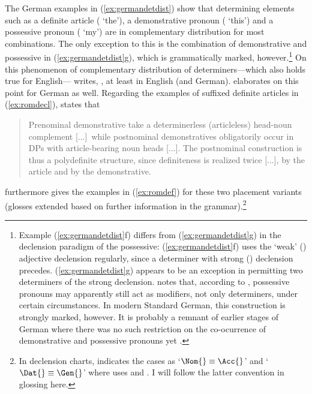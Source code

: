 The German examples in (\ref{ex:germandetdist}) show that determining elements
such as a definite article ( `the'), a demonstrative pronoun
( `this') and a possessive pronoun ( `my') are in
complementary distribution for most combinations. The only exception to this is
the combination of demonstrative and possessive in (\ref{ex:germandetdist}g),
which is grammatically marked, however.\footnote{Example
(\ref{ex:germandetdist}f) differs from (\ref{ex:germandetdist}g) in the
declension paradigm of the possessive: (\ref{ex:germandetdist}f) uses the
`weak' (\Wk) adjective declension regularly, since a determiner with strong
(\St) declension precedes. (\ref{ex:germandetdist}g) appears to be an exception
in permitting two determiners of the strong declension. \citet[160--161,
203--205]{demske2001} notes that, according to \citet{plank1992}, possessive
pronouns may apparently still act as modifiers, not only determiners, under
certain circumstances. In modern Standard German, this construction is strongly
marked, however. It is probably a remnant of earlier stages of German where
there was no such restriction on the co-ocurrence of demonstrative and
possessive pronouns yet \citep[173]{demske2001}.} On this phenomenon of
complementary distribution of determiners---which also holds true for
English---\citet{carnie2013} writes, , at least in English (and German).
\citet[9--22]{demske2001} elaborates on this point for German as well.
Regarding the examples of suffixed definite articles in (\ref{ex:romdecl}),
\citet{dindelegan2013} states that

\blockcquote[297]{dindelegan2013}{Prenominal demonstrative \sic{} take a
determinerless (articleless) head-noun complement [...]\ while postnominal
demonstratives obligatorily occur in DPs with article-bearing noun heads [...].
The postnominal construction is thus a polydefinite structure, since
definiteness is realized twice [...], by the article and by the demonstrative.}

\citet{dindelegan2013} furthermore gives the examples in (\ref{ex:romdef}) for
these two placement variants (glosses extended based on further information in
the grammar).\footnote{In declension charts, \citet{dindelegan2013} indicates
the cases as `$\Nom{}\equiv\Acc{}$' and `$\Dat{}\equiv\Gen{}$' where
\citet{lyons1999} uses \Pri{} and \Obl{}. I will follow the latter convention
in glossing here.}


